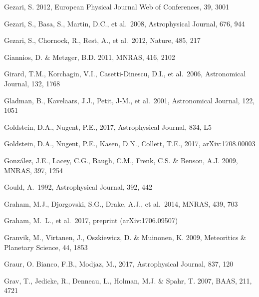 \documentclass[twocolumn]{aastex61}
\begin{document}
\begin{thebibliography}{}

 Gezari, S. 2012, European Physical Journal Web of Conferences, 39, 3001

 Gezari, S., Basa, S., Martin, D.C., et al.~2008, Astrophysical Journal, 676, 944

 Gezari, S., Chornock, R., Rest, A., et al.~2012, Nature, 485, 217

 Giannios, D. \& Metzger, B.D. 2011, MNRAS, 416, 2102

 Girard, T.M., Korchagin, V.I., Casetti-Dinescu, D.I., et al.~2006, Astronomical Journal, 132, 1768

 Gladman, B., Kavelaars, J.J., Petit, J-M., et al.~2001, Astronomical Journal, 122, 1051

 Goldstein, D.A., Nugent, P.E., 2017, Astrophysical Journal, 834, L5

 Goldstein, D.A., Nugent, P.E., Kasen, D.N., Collett, T.E., 2017, arXiv:1708.00003

 Gonz\'{a}lez, J.E., Lacey, C.G., Baugh, C.M., Frenk, C.S. \& Benson, A.J. 2009, MNRAS, 397, 1254

 Gould, A.\ 1992, Astrophysical Journal, 392, 442

 Graham, M.J., Djorgovski, S.G., Drake, A.J., et al.~2014, MNRAS, 439, 703

 Graham, M.~L., et al.~2017, preprint (arXiv:1706.09507)

 Granvik, M., Virtanen, J., Oszkiewicz, D. \& Muinonen, K. 2009, Meteoritics \& Planetary Science, 44, 1853

 Graur, O. Bianco, F.B., Modjaz, M., 2017, Astrophysical Journal, 837, 120

 Grav, T., Jedicke, R., Denneau, L., Holman, M.J.  \& Spahr, T. 2007, BAAS, 211, 4721


\end{thebibliography}
\end{document}
